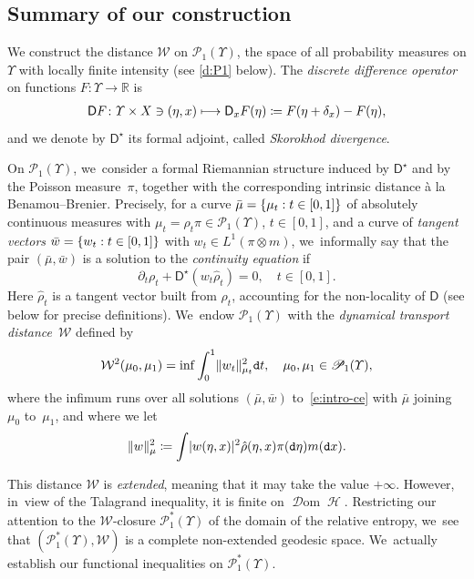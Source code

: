 \documentclass[10pt]{amsart}
\newcommand\mto{\mathchoice{\longmapsto}{\mapsto}{\mapsto}{\mapsto}}
\theoremstyle{definition}
\theoremstyle{remark}
\DeclarePairedDelimiter{\set}{\lbrace}{\rbrace}
\DeclarePairedDelimiter{\abs}{\lvert}{\rvert}
\DeclarePairedDelimiter{\norm}{\lVert}{\rVert}
\DeclareMathOperator{\ent}{\mathcal{H}}
\DeclareMathOperator{\dom}{\mathscr{D}om}
\begin{document}
\subsection{Summary of our construction}
We construct the distance $\mathcal{W}$ on $\mathscr{P}_{1}(\varUpsilon)$, the space of all probability measures on $\varUpsilon$ with locally finite intensity (see \cref{d:P1} below).
The \emph{discrete difference operator} on functions $F\colon\varUpsilon\to\mathbb{R}$ is
\begin{align*}
\mathsf{D} F\colon \varUpsilon\times X\ni (\eta,x) \mto \mathsf{D}_x F(\eta) \coloneq F(\eta+\delta_x)-F(\eta),
\end{align*}
and we denote by $\mathsf{D}^{\star}$ its formal adjoint, called \emph{Skorokhod divergence}.

On $\mathscr{P}_{1}(\varUpsilon)$, we~consider a formal Riemannian structure induced by $\mathsf{D}^{\star}$ and by the Poisson measure~$\pi$, together with the corresponding intrinsic distance à la Benamou--Brenier.
Precisely, for a curve $\bar\mu= \set{ \mu_{t} : t \in [0,1]}$ of absolutely continuous measures with $\mu_t=\rho_t\pi\in\mathscr{P}_{1}(\varUpsilon)$, $t \in [0,1]$, and a curve of \emph{tangent vectors} $\bar{w}= \set{ w_{t} : t \in [0,1] }$ with $w_t\in L^1(\pi\otimes m)$, we~informally say that the pair $(\bar{\mu},\bar{w})$ is a solution to the \emph{continuity equation} if
\begin{equation}\label{e:intro-ce}
\partial_{t} \rho_{t} + \mathsf{D}^{\star}(w_{t} \hat{\rho}_{t}) = 0, \quad t\in [0,1].
\end{equation}
Here $\hat{\rho}_t$ is a tangent vector built from $\rho_t$, accounting for the non-locality of $\mathsf{D}$ (see below for precise definitions). We~endow $\mathscr{P}_{1}(\varUpsilon)$ with the \emph{dynamical transport distance}~$\mathcal{W}$ defined by
\begin{equation*}
\mathcal{W}^{2}(\mu_{0}, \mu_{1}) = \inf \int_0^1 \norm{w_t}_{\mu_{t}}^2 \mathtt{d} t, \quad \mu_0,\mu_1\in\mathscr{P}_1(\varUpsilon),
\end{equation*}
where the infimum runs over all solutions $(\bar{\mu},\bar{w})$ to~\cref{e:intro-ce} with $\bar{\mu}$ joining $\mu_{0}$ to~$\mu_{1}$, and where we let
\begin{equation*}
\norm{w}_{\mu}^{2} \coloneq \int \abs{w(\eta, x)}^{2} \hat{\rho}(\eta, x) \pi(\mathtt{d} \eta) m(\mathtt{d} x) .
\end{equation*}

This distance $\mathcal{W}$ is \emph{extended}, meaning that it may take the value $+\infty$.
However, in~view of the Talagrand inequality, it is finite on $\dom \ent$.
Restricting our attention to the $\mathcal W$-closure $\mathscr{P}_{1}^{*}(\varUpsilon)$ of the domain of the relative entropy, we~see that $(\mathscr{P}_{1}^{*}(\varUpsilon), \mathcal{W})$ is a complete non-extended geodesic space. We~actually establish our functional inequalities on $\mathscr{P}_{1}^{*}(\varUpsilon)$.
\end{document}
